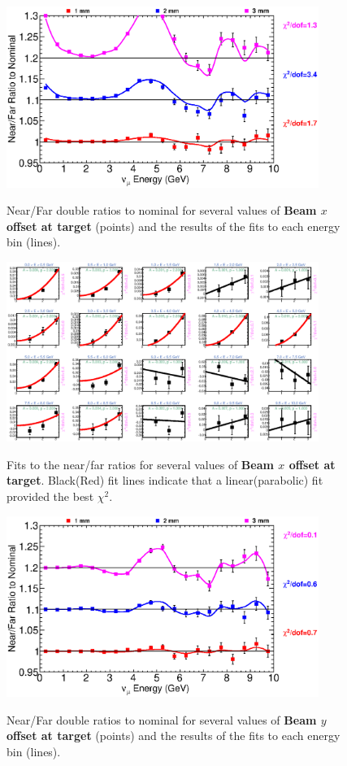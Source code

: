 \begin{figure}[ht]
  \begin{center}
    {\includegraphics[width=4.0in]{figures/NominalX_nof_summary.eps}}
  \end{center}
\caption{ Near/Far double ratios to nominal for several values of {\bf Beam $x$ offset at target} (points) and the results of the fits to each energy bin (lines).}
\end{figure}

\begin{figure}[hb]
  \begin{center}
    {\includegraphics[width=4.0in]{figures/NominalX_nof_fits.eps}}
  \end{center}
\caption{ Fits to the near/far ratios for several values of {\bf Beam $x$ offset at target}. Black(Red) fit lines indicate that a linear(parabolic) fit provided the best $\chi^2$. }
\end{figure}

\begin{figure}[ht]
  \begin{center}
    {\includegraphics[width=4.0in]{figures/NominalY_nof_summary.eps}}
  \end{center}
\caption{ Near/Far double ratios to nominal for several values of {\bf Beam $y$ offset at target} (points) and the results of the fits to each energy bin (lines).}
\end{figure}

